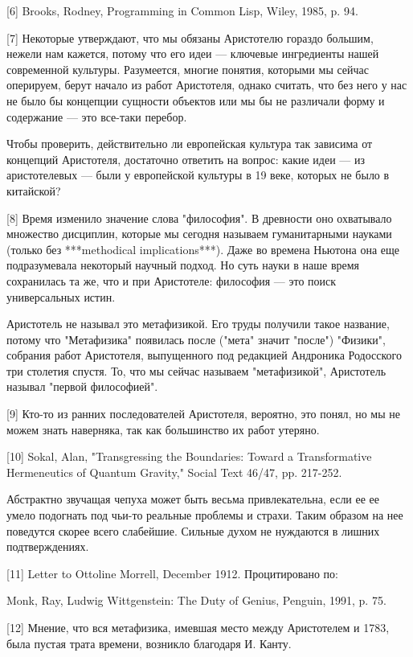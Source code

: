 \documentclass[ebook,12pt,oneside,openany]{memoir}
\begin{document}
[6] Brooks, Rodney, Programming in Common Lisp, Wiley, 1985, p. 94.

[7] Некоторые утверждают, что мы обязаны Аристотелю гораздо большим,
нежели нам кажется, потому что его идеи — ключевые ингредиенты нашей
современной культуры. Разумеется, многие понятия, которыми мы сейчас
оперируем, берут начало из работ Аристотеля, однако считать, что без
него у нас не было бы концепции сущности объектов или мы бы не
различали форму и содержание — это все-таки перебор.

Чтобы проверить, действительно ли европейская культура так зависима от
концепций Аристотеля, достаточно ответить на вопрос: какие идеи — из
аристотелевых — были у европейской культуры в 19 веке, которых не было
в китайской?

[8] Время изменило значение слова "философия". В древности оно
охватывало множество дисциплин, которые мы сегодня называем
гуманитарными науками (только без ***methodical implications***). Даже
во времена Ньютона она еще подразумевала некоторый научный подход. Но
суть науки в наше время сохранилась та же, что и при Аристотеле:
философия — это поиск универсальных истин.

Аристотель не называл это метафизикой. Его труды получили такое
название, потому что "Метафизика" появилась после ("мета" значит
"после") "Физики", собрания работ Аристотеля, выпущенного под
редакцией Андроника Родосского три столетия спустя. То, что мы сейчас
называем "метафизикой", Аристотель называл "первой философией".

[9] Кто-то из ранних последователей Аристотеля, вероятно, это понял,
но мы не можем знать наверняка, так как большинство их работ утеряно.

[10] Sokal, Alan, "Transgressing the Boundaries: Toward a
Transformative Hermeneutics of Quantum Gravity," Social Text 46/47,
pp. 217-252.

Абстрактно звучащая чепуха может быть весьма привлекательна, если ее
ее умело подогнать под чьи-то реальные проблемы и страхи. Таким
образом на нее поведутся скорее всего слабейшие. Сильные духом не
нуждаются в лишних подтверждениях.

[11] Letter to Ottoline Morrell, December 1912. Процитировано по:

Monk, Ray, Ludwig Wittgenstein: The Duty of Genius, Penguin, 1991, p.
75.

[12] Мнение, что вся метафизика, имевшая место между Аристотелем и
1783, была пустая трата времени, возникло благодаря И. Канту.
\end{document}
